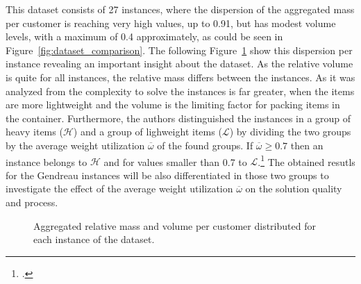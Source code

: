 This dataset consists of 27 instances, where the dispersion of the aggregated mass per customer is reaching very high values, up to
0.91, but has modest volume levels, with a maximum of 0.4 approximately, as could be seen in Figure~\ref{fig:dataset_comparison}. The
following Figure~\ref{fig:aggregated_gendreau_plots} show this dispersion per instance revealing an important insight about the dataset.
As the relative volume is quite for all instances, the relative mass differs between the instances. As it was analyzed from \cite{tamke_branch-and-cut_2024}
the complexity to solve the instances is far greater, when the items are more lightweight and the volume is the limiting factor
for packing items in the container. Furthermore, the authors distinguished the instances in a group of heavy items ($\mathcal{H}$) and
a group of lighweight items ($\mathcal{L}$) by dividing the two groups by the average weight utilization $\overline{\omega}$ of the found
groups. If $\overline{\omega} \geq 0.7$ then an instance belongs to $\mathcal{H}$ and for values smaller than 0.7 to $\mathcal{L}$.\footcite[cf.][pp. 23-25]{tamke_branch-and-cut_2024}
The obtained resutls for the Gendreau instances will be also differentiated in those two groups to investigate the effect of
the average weight utilization $\overline{\omega}$ on the solution quality and process.

\begin{figure}[ht]
    \centering
    \caption{Aggregated relative mass and volume per customer distributed for each instance of the \gendreauDataSetText dataset.}
    \label{fig:aggregated_gendreau_plots}
\end{figure}

